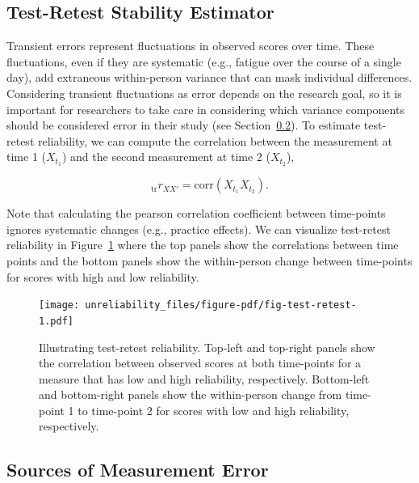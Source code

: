 \documentclass[
  letterpaper,
  DIV=11,
  numbers=noendperiod]{scrreprt}
\begin{document}
\hypertarget{test-retest-stability-estimator}{%
\subsection{Test-Retest Stability
Estimator}\label{test-retest-stability-estimator}}

Transient errors represent fluctuations in observed scores over time.
These fluctuations, even if they are systematic (e.g., fatigue over the
course of a single day), add extraneous within-person variance that can
mask individual differences. Considering transient fluctuations as error
depends on the research goal, so it is important for researchers to take
care in considering which variance components should be considered error
in their study (see Section~\ref{sec-sources}). To estimate test-retest
reliability, we can compute the correlation between the measurement at
time 1 (\(X_{t_1}\)) and the second measurement at time 2 (\(X_{t_2}\)),

\[
_\text{tr}r_{XX'}= \text{corr}(X_{t_1}X_{t_2}).
\]

Note that calculating the pearson correlation coefficient between
time-points ignores systematic changes (e.g., practice effects). We can
visualize test-retest reliability in Figure~\ref{fig-test-retest} where
the top panels show the correlations between time points and the bottom
panels show the within-person change between time-points for scores with
high and low reliability.

\begin{figure}[H]

{\centering \texttt{[image: unreliability\_files/figure-pdf/fig-test-retest-1.pdf]}

}

\caption{\label{fig-test-retest}Illustrating test-retest reliability.
Top-left and top-right panels show the correlation between observed
scores at both time-points for a measure that has low and high
reliability, respectively. Bottom-left and bottom-right panels show the
within-person change from time-point 1 to time-point 2 for scores with
low and high reliability, respectively.}

\end{figure}

\hypertarget{sec-sources}{%
\subsection{Sources of Measurement Error}\label{sec-sources}}
\end{document}
